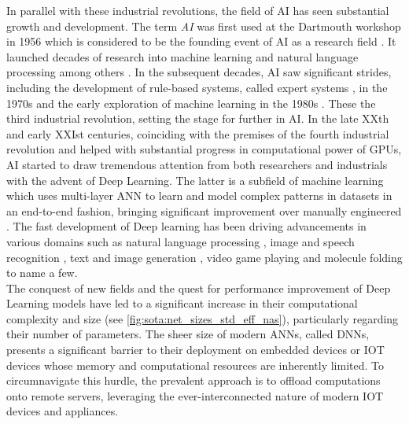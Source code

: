 In parallel with these industrial revolutions, the field of \ac{AI} has seen
substantial growth and development. The term \emph{\acl{AI}} was first used at
the Dartmouth workshop in 1956 which is considered to be the founding event of
\ac{AI} as a research field \cite{dartmouth1956}. It launched decades of
research into machine learning and natural language processing among others
\cite{nilsson1998artificial}. In the subsequent decades, \ac{AI} saw significant
strides, including the development of rule-based systems, called expert systems
\cite{giarratano1994expert}, in the 1970s and the early exploration of machine
learning in the 1980s \cite{rumelhart1986learning}. These \DIFdelbegin {}\DIFdelend \DIFaddbegin {}\DIFaddend the third industrial revolution, setting the stage for further
\DIFdelbegin {}\DIFdelend \DIFaddbegin {}\DIFaddend in \ac{AI}. In the late XXth and early XXIst centuries, coinciding with
the premises of the fourth industrial revolution and helped with substantial
progress in computational power of \acp{GPU}, \ac{AI} started to draw tremendous
attention from both researchers and industrials with the advent of Deep
Learning. The latter is a subfield of machine learning which uses multi-layer
\ac{ANN} to learn and model complex patterns in datasets in an end-to-end
fashion, bringing significant improvement over manually engineered \DIFdelbegin {}\DIFdelend \DIFaddbegin {}\DIFaddend . The fast development of Deep learning has been driving advancements
in various domains such as natural language processing
\cite{DBLP:conf/emnlp/BudzianowskiV19,DBLP:conf/naacl/DevlinCLT19,DBLP:conf/nips/VaswaniSPUJGKP17},
image and speech recognition
\cite{DBLP:conf/nips/KrizhevskySH12,DBLP:journals/corr/SimonyanZ14a,DBLP:conf/cvpr/HeZRS16,DBLP:journals/corr/HannunCCCDEPSSCN14,DBLP:conf/icassp/ChanJLV16,DBLP:conf/icml/AmodeiABCCCCCCD16},
text and image generation
\cite{goodfellow2020generative,karras2019style,DBLP:conf/emnlp/BudzianowskiV19},
video game playing \cite{silver2016mastering,silver2018general} and molecule
folding \cite{jumper2021highly} to name a few.\\


The conquest of new fields and the quest for performance improvement of Deep
Learning models have led to a significant increase in their computational
complexity and size (see \cref{fig:sota:net_sizes_std_eff_nas}), particularly
regarding their number of parameters. The sheer size of modern \acp{ANN}, called
\acp{DNN}, presents a significant barrier to their deployment on embedded
devices or \ac{IOT} devices whose memory and computational resources are
inherently limited. To circumnavigate this hurdle, the prevalent approach is to
offload computations onto remote servers, leveraging the ever-interconnected
nature of modern \ac{IOT} devices and appliances.\\

